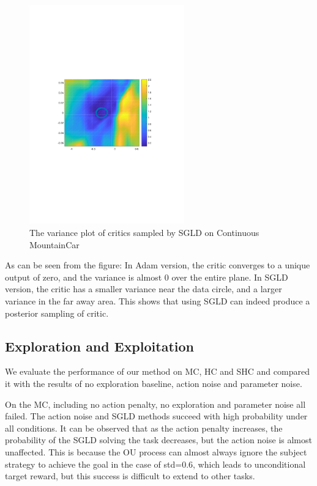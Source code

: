 \begin{figure}[htb]
   \begin{center}   
   \centerline{\includegraphics[width=190pt,trim=100 280 100 280,clip]{figs/mc_sgld_state.pdf}}
   \caption{The variance plot of critics sampled by SGLD on Continuous MountainCar}
   \label{fig:stateaction}   
   \end{center}
\end{figure}
As can be seen from the figure: In Adam version, the critic converges to a unique output of zero, and the variance is almost 0 over the entire plane. In SGLD version, the critic has a smaller variance near the data circle, and a larger variance in the far away area. This shows that using SGLD can indeed produce a posterior sampling of critic.

\subsection{Exploration and Exploitation}
We evaluate the performance of our method on MC, HC and SHC and compared it with the results of no exploration baseline, action noise and parameter noise.

On the MC, including no action penalty, no exploration and parameter noise all failed. The action noise and SGLD methods succeed with high probability under all conditions. It can be observed that as the action penalty increases, the probability of the SGLD solving the task decreases, but the action noise is almost unaffected. This is because the OU process can almost always ignore the subject strategy to achieve the goal in the case of std=0.6, which leads to unconditional target reward, but this success is difficult to extend to other tasks.

